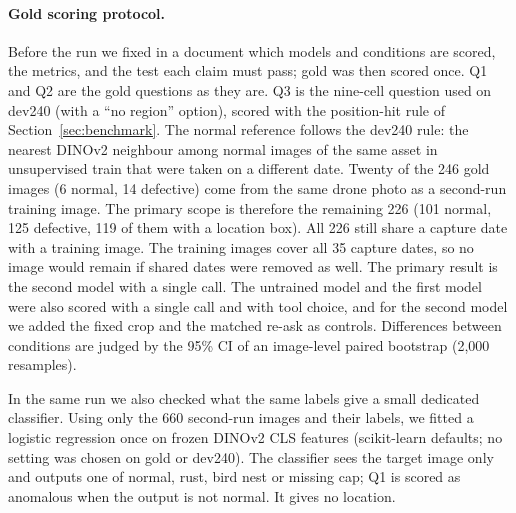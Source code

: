 \documentclass[11pt]{article}
\begin{document}
\paragraph{Gold scoring protocol.} Before the run we fixed in a document which models and conditions are scored, the metrics, and the test each claim must pass; gold was then scored once. Q1 and Q2 are the gold questions as they are. Q3 is the nine-cell question used on dev240 (with a ``no region'' option), scored with the position-hit rule of Section~\ref{sec:benchmark}. The normal reference follows the dev240 rule: the nearest DINOv2 neighbour among normal images of the same asset in unsupervised train that were taken on a different date. Twenty of the 246 gold images (6 normal, 14 defective) come from the same drone photo as a second-run training image. The primary scope is therefore the remaining 226 (101 normal, 125 defective, 119 of them with a location box). All 226 still share a capture date with a training image. The training images cover all 35 capture dates, so no image would remain if shared dates were removed as well. The primary result is the second model with a single call. The untrained model and the first model were also scored with a single call and with tool choice, and for the second model we added the fixed crop and the matched re-ask as controls. Differences between conditions are judged by the 95\% CI of an image-level paired bootstrap (2,000 resamples).

In the same run we also checked what the same labels give a small dedicated classifier. Using only the 660 second-run images and their labels, we fitted a logistic regression once on frozen DINOv2 CLS features (scikit-learn defaults; no setting was chosen on gold or dev240). The classifier sees the target image only and outputs one of normal, rust, bird nest or missing cap; Q1 is scored as anomalous when the output is not normal. It gives no location.
\end{document}
